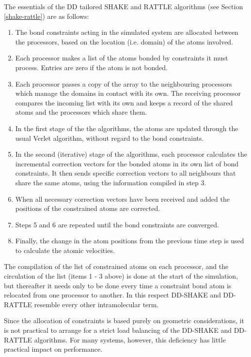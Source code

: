 The essentials of the DD tailored SHAKE and
RATTLE algorithms (see Section
\ref{shake-rattle}) are as follows:
\begin{enumerate}
\item The bond constraints acting in the simulated system are allocated
between the processors, based on the location (i.e. domain) of
the atoms involved.
\item Each processor makes a list of the atoms bonded by
constraints it must process. Entries are zero
if the atom is not bonded.
\item Each processor passes a copy of the array to the neighbouring
processors which manage the domains in contact with its own.
The receiving processor compares the incoming list with its own and
keeps a record of the shared atoms and the processors which share
them.
\item In the first stage of the the algorithms, the atoms
are updated through the usual Verlet
algorithm, without regard to the bond
constraints.
\item In the second (iterative) stage of the algorithms, each
processor calculates the incremental correction vectors for the
bonded atoms in its own list of bond
constraints.  It then sends specific correction vectors to all
neighbours that share the same atoms, using the information
compiled in step 3.
\item When all necessary correction vectors have been received and
added the positions of the constrained atoms are corrected.
\item Steps 5 and 6 are repeated until the bond constraints are
converged.
\item Finally, the change in the atom positions from the previous
time step is used to calculate the atomic velocities.
\end{enumerate}

The compilation of the list of constrained atoms on each
processor, and the circulation of the list (items 1 - 3 above) is
done at the start of the simulation, but thereafter it needs only
to be done every time a constraint bond atom is relocated from one
processor to another.  In this respect DD-SHAKE and DD-RATTLE
resemble every other intramolecular term.

Since the allocation of constraints is based purely on geometric
considerations, it is not practical to arrange for a strict load
balancing of the DD-SHAKE and DD-RATTLE algorithms.  For many
systems, however, this deficiency has little practical impact on
performance.

